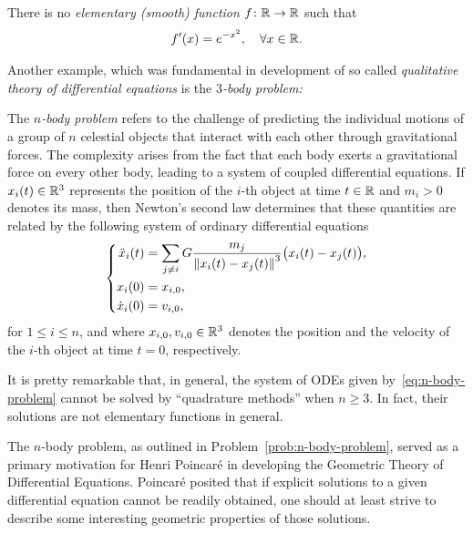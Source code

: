 \begin{example}
  There is no \emph{elementary (smooth) function} $f\colon\mathbb{R}\to\mathbb{R}$ such that
  \begin{displaymath}
    f'(x)=e^{-x^{2}}, \quad\forall x\in\mathbb{R}.
  \end{displaymath}
\end{example}

Another example, which was fundamental in development of so called \emph{qualitative theory of differential equations} is the \emph{$3$-body problem:}

\begin{problem}\label{prob:n-body-problem}
  The \emph{$n$-body problem} refers to the challenge of predicting the individual motions of a group of $n$ celestial objects that interact with each other through gravitational forces. The complexity arises from the fact that each body exerts a gravitational force on every other body, leading to a system of coupled differential equations. If $x_{i}(t)\in\mathbb{R}^{3}$ represents the position of the $i$-th object at time $t\in\mathbb{R}$ and $m_{i}>0$ denotes its mass, then Newton's second law determines that these quantities are related by the following system of ordinary differential equations
  \begin{equation}
    \label{eq:n-body-problem}
    \left\{
      \begin{aligned}
        \ddot x_{i}(t) &= \sum_{j\neq i} G\frac{m_{j}}{\left\|{x_{i}(t)-x_{j}(t)}\right\|^{3}}\big(x_{i}(t)-x_{j}(t)\big), \\
        x_{i}(0)&=x_{i,0}, \\
        \dot x_{i}(0)&=v_{i,0},
      \end{aligned}
    \right.
  \end{equation}
  for $1\leq i\leq n$, and where $x_{i,0},v_{i,0}\in\mathbb{R}^{3}$ denotes the position and the velocity of the $i$-th object at time $t=0$, respectively.

  It is pretty remarkable that, in general, the system of ODEs given by~\eqref{eq:n-body-problem} cannot be solved by ``quadrature methods'' when $n\geq 3$. In fact, their solutions are not elementary functions in general.
\end{problem}

The $n$-body problem, as outlined in Problem~\ref{prob:n-body-problem}, served as a primary motivation for Henri Poincaré in developing the Geometric Theory of Differential Equations. Poincaré posited that if explicit solutions to a given differential equation cannot be readily obtained, one should at least strive to describe some interesting geometric properties of those solutions.

